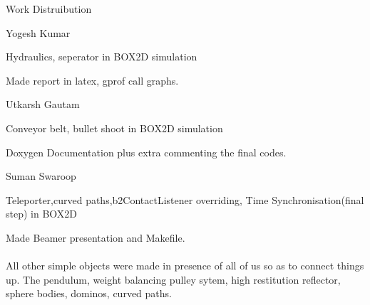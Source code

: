 \documentclass[a4paper,11pt]{resume}
\begin{document}
\newpage
\begin{rSection}{{\heading Work Distruibution}} 
\\
\begin{rSubsection}{{\heading Yogesh Kumar}}{}{}{}
\item Hydraulics, seperator in BOX2D simulation
\item Made report in latex, gprof call graphs.
\end{rSubsection}

\begin{rSubsection}{{\heading Utkarsh Gautam}}{}{}{}
\item Conveyor belt, bullet shoot in BOX2D simulation
\item Doxygen Documentation plus extra commenting the final codes.
\end{rSubsection}

\begin{rSubsection}{{\heading Suman Swaroop}}{}{}{}
\item Teleporter,curved paths,b2ContactListener overriding, Time Synchronisation(final step) in BOX2D
\item Made Beamer presentation and Makefile.
\\ \\
All other simple objects were made in presence of all of us so as to connect things up.
The pendulum, weight balancing pulley sytem, high restitution reflector, sphere bodies, dominos, curved paths. \\
\end{rSubsection}



\end{rSection}
\end{document}
